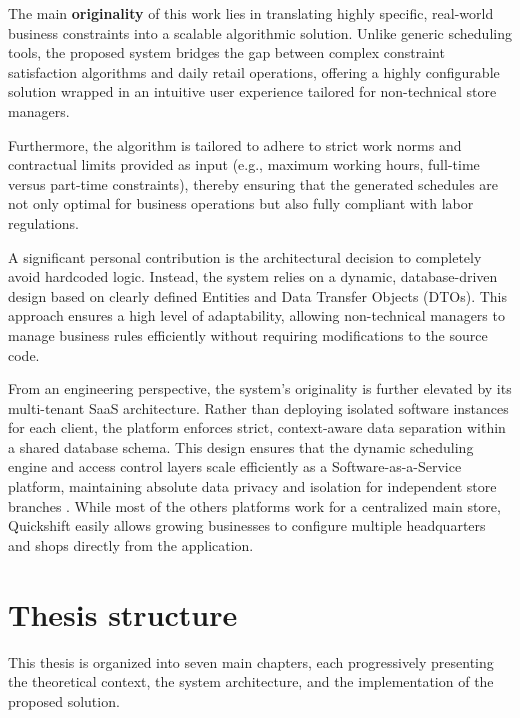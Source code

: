 The main \textbf{originality} of this work lies in translating highly specific, real-world business constraints into a scalable algorithmic solution. Unlike generic scheduling tools, the proposed system bridges the gap between complex constraint satisfaction algorithms and daily retail operations, offering a highly configurable solution wrapped in an intuitive user experience tailored for non-technical store managers. 
\par Furthermore, the algorithm is tailored to adhere to strict work norms and contractual limits provided as input (e.g., maximum working hours, full-time versus part-time constraints), thereby ensuring that the generated schedules are not only optimal for business operations but also fully compliant with labor regulations.
\par A significant personal contribution is the architectural decision to completely avoid hardcoded logic. Instead, the system relies on a dynamic, database-driven design based on clearly defined Entities and Data Transfer Objects (DTOs). This approach ensures a high level of adaptability, allowing non-technical managers to manage business rules efficiently without requiring modifications to the source code.
\par From an engineering perspective, the system's originality is further elevated by its multi-tenant SaaS architecture. Rather than deploying isolated software instances for each client, the platform enforces strict, context-aware data separation within a shared database schema. This design ensures that the dynamic scheduling engine and access control layers scale efficiently as a Software-as-a-Service platform, maintaining absolute data privacy and isolation for independent store branches \cite{SaaSArchitecture}. While most of the others platforms work for a centralized main store, Quickshift easily allows growing businesses to configure multiple headquarters and shops directly from the application.

\section{Thesis structure}

This thesis is organized into seven main chapters, each progressively presenting the theoretical context, the system architecture, and the implementation of the proposed solution.



\setlength{\leftmargin}{0pt}
\setlength{\itemsep}{0.6em}
\setlength{\parskip}{0pt}

